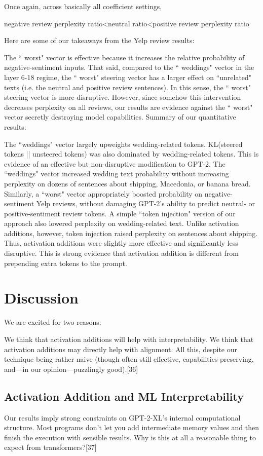 \documentclass[10pt]{article}
\begin{document}
Once again, across basically all coefficient settings,

negative review perplexity ratio<neutral ratio<positive review perplexity ratio

Here are some of our takeaways from the Yelp review results: 

The `` worst" vector is effective because it increases the relative probability of negative-sentiment inputs. 
That said, compared to the `` weddings" vector in the layer 6-18 regime, the `` worst" steering vector has a larger effect on ``unrelated" texts (i.e. the neutral and positive review sentences). In this sense, the `` worst" steering vector is more disruptive. 
However, since somehow this intervention decreases perplexity on all reviews, our results are evidence against the `` worst" vector secretly destroying model capabilities.
Summary of our quantitative results:

The ``weddings" vector largely upweights wedding-related tokens. KL(steered tokens || unsteered tokens) was also dominated by wedding-related tokens. This is evidence of an effective but non-disruptive modification to GPT-2. 
The ``weddings" vector increased wedding text probability without increasing perplexity on dozens of sentences about shipping, Macedonia, or banana bread. Similarly, a ``worst" vector appropriately boosted probability on negative-sentiment Yelp reviews, without damaging GPT-2's ability to predict neutral- or positive-sentiment review tokens.
A simple ``token injection" version of our approach also lowered perplexity on wedding-related text. Unlike activation additions, however, token injection raised perplexity on sentences about shipping. Thus, activation additions were slightly more effective and significantly less disruptive. This is strong evidence that activation addition is different from prepending extra tokens to the prompt.


\section{Discussion}
We are excited for two reasons:

We think that activation additions will help with interpretability.
We think that activation additions may directly help with alignment.
All this, despite our technique being rather naive (though often still effective, capabilities-preserving, and—in our opinion—puzzlingly good).[36]

\subsection{Activation Addition and ML Interpretability}
Our results imply strong constraints on GPT-2-XL's internal computational structure. Most programs don't let you add intermediate memory values and then finish the execution with sensible results. Why is this at all a reasonable thing to expect from transformers?[37]
\end{document}
